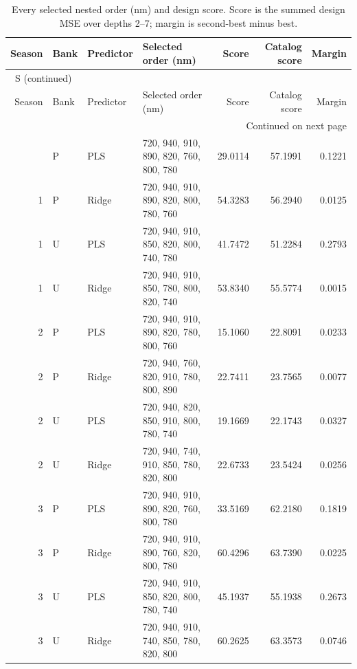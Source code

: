 \documentclass[10pt,a4paper]{article}
\renewcommand{\thetable}{S\arabic{table}}
\begin{document}
\begingroup\footnotesize
\setlength{\tabcolsep}{3.5pt}
\renewcommand{\arraystretch}{1.10}
\begin{longtable}{rlllrrr}
\caption{Every selected nested order (nm) and design score. Score is the summed design MSE over depths 2--7; margin is second-best minus best.}\label{tab:orders}\\
\toprule
Season & Bank & Predictor & Selected order (nm) & Score & Catalog score & Margin \\
\midrule
\endfirsthead
\multicolumn{7}{l}{\tablename~\thetable{} (continued)}\\
\toprule
Season & Bank & Predictor & Selected order (nm) & Score & Catalog score & Margin \\
\midrule
\endhead
\midrule
\multicolumn{7}{r}{Continued on next page}\\
\endfoot
\bottomrule
\endlastfoot
1 & P & PLS & 720, 940, 910, 890, 820, 760, 800, 780 & 29.0114 & 57.1991 & 0.1221 \\
1 & P & Ridge & 720, 940, 910, 890, 820, 800, 780, 760 & 54.3283 & 56.2940 & 0.0125 \\
1 & U & PLS & 720, 940, 910, 850, 820, 800, 740, 780 & 41.7472 & 51.2284 & 0.2793 \\
1 & U & Ridge & 720, 940, 910, 850, 780, 800, 820, 740 & 53.8340 & 55.5774 & 0.0015 \\
2 & P & PLS & 720, 940, 910, 890, 820, 780, 800, 760 & 15.1060 & 22.8091 & 0.0233 \\
2 & P & Ridge & 720, 940, 760, 820, 910, 780, 800, 890 & 22.7411 & 23.7565 & 0.0077 \\
2 & U & PLS & 720, 940, 820, 850, 910, 800, 780, 740 & 19.1669 & 22.1743 & 0.0327 \\
2 & U & Ridge & 720, 940, 740, 910, 850, 780, 820, 800 & 22.6733 & 23.5424 & 0.0256 \\
3 & P & PLS & 720, 940, 910, 890, 820, 760, 800, 780 & 33.5169 & 62.2180 & 0.1819 \\
3 & P & Ridge & 720, 940, 910, 890, 760, 820, 800, 780 & 60.4296 & 63.7390 & 0.0225 \\
3 & U & PLS & 720, 940, 910, 850, 820, 800, 780, 740 & 45.1937 & 55.1938 & 0.2673 \\
3 & U & Ridge & 720, 940, 910, 740, 850, 780, 820, 800 & 60.2625 & 63.3573 & 0.0746 \\
\end{longtable}
\endgroup
\end{document}
